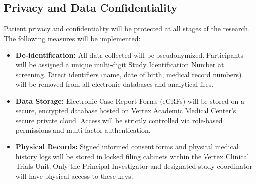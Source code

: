 \subsection{Privacy and Data Confidentiality}
Patient privacy and confidentiality will be protected at all stages of the research. The following measures will be implemented:
\begin{itemize}
    \item \textbf{De-identification:} All data collected will be pseudonymized. Participants will be assigned a unique multi-digit Study Identification Number at screening. Direct identifiers (name, date of birth, medical record numbers) will be removed from all electronic databases and analytical files.
    \item \textbf{Data Storage:} Electronic Case Report Forms (eCRFs) will be stored on a secure, encrypted database hosted on Vertex Academic Medical Center's secure private cloud. Access will be strictly controlled via role-based permissions and multi-factor authentication.
    \item \textbf{Physical Records:} Signed informed consent forms and physical medical history logs will be stored in locked filing cabinets within the Vertex Clinical Trials Unit. Only the Principal Investigator and designated study coordinator will have physical access to these keys.
\end{itemize}

